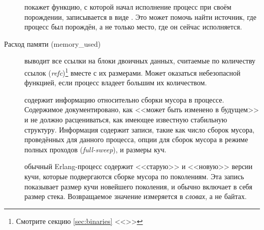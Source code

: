 \documentclass[11pt, oneside]{book}   	%
\newcommand\NamedRef[1]{\ref{#1} <<\nameref{#1}>>}
\begin{document}
\begin{description*}
\begin{description}
	\item[] покажет функцию, с которой начал исполнение процесс при своём порождении, записывается в виде . Это может помочь найти источник, где процесс был порождён, а не только место, где он сейчас исполняется.
\end{description}

\item[Расход памяти (memory\_used)] \hfill
	\begin{description}
	\item[] выводит все ссылки на блоки двоичных данных, считаемые по количеству ссылок (\emph{refc})\footnote{Смотрите секцию \NamedRef{sec:binaries}} вместе с их размерами. Может оказаться небезопасной функцией, если процесс владеет большим их количеством.
		
	\item[] содержит информацию относительно сборки мусора в процессе. Содержимое документировано, как <<может быть изменено в будущем>> и не должно расцениваться, как имеющее известную стабильную структуру. Информация содержит записи, такие как число сборок мусора, проведённых для данного процесса, опции для сборок мусора в режиме полных проходов (\emph{full-sweep}), и размеры куч.

	\item[] обычный Erlang-процесс содержит <<старую>> и <<новую>> версии кучи, которые подвергаются сборке мусора по поколениям. Эта запись показывает размер кучи новейшего поколения, и обычно включает в себя размер стека. Возвращаемое значение измеряется в \emph{словах}, а не байтах.
	

\end{description}
\end{description*}
\end{document}
